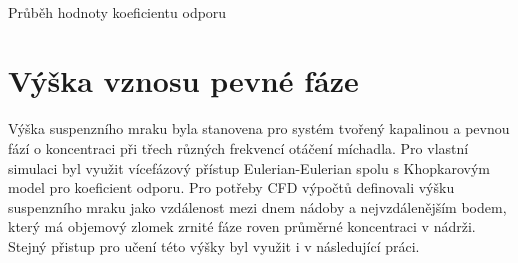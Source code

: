 \begin{grf}[h!]
 \centering
  \\ 
  \caption{Průběh hodnoty koeficientu odporu}
  \label{fig:cd}
\end{grf}
\newpage

\section{Výška vznosu pevné fáze}
Výška suspenzního mraku byla stanovena pro systém tvořený kapalinou \pvpS{} a pevnou fází o koncentraci  při třech různých frekvencí otáčení míchadla. Pro vlastní simulaci byl využit vícefázový přístup Eulerian-Eulerian spolu s Khopkarovým model pro koeficient odporu. Pro potřeby CFD výpočtů \citet{kas08} definovali výšku suspenzního mraku jako vzdálenost mezi dnem nádoby a nejvzdálenějším bodem, který má objemový zlomek zrnité fáze roven průměrné koncentraci v nádrži. Stejný přistup pro učení této výšky byl využit i v následující práci.  

